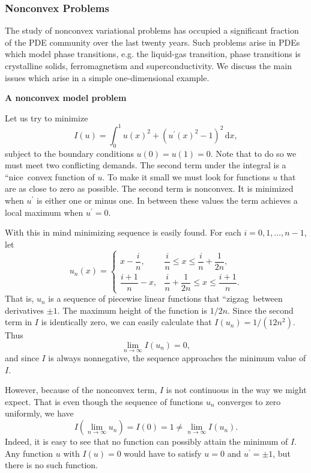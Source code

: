 \subsubsection{Nonconvex Problems}\label{subsec:nonconvex-variational-problems}

The study of nonconvex variational problems has occupied a significant fraction of the PDE community over the last twenty years. Such problems arise in PDEs which model phase transitions, e.g. the liquid-gas transition, phase transitions is crystalline solids, ferromagnetism and superconductivity. We discuss the main issues which arise in a simple one-dimensional example.

\textbf{A nonconvex model problem}

Let us try to minimize
\begin{equation}\label{eq:nonconvex-one-dimensional-model-energy}
I(u)=\int_0^1u(x)^2+(u^{\prime}(x)^2-1)^2\,\mathrm{d}x,
\end{equation}
subject to the boundary conditions $u(0)=u(1)=0$. Note that to do so we must meet two conflicting demands. The second term under the integral is a ``nice\textquotesingle\textquotesingle\ convex function of $u$. To make it small we must look for functions $u$ that are as close to zero as possible. The second term is nonconvex. It is minimized when $u^{\prime}$ is either one or minus one. In between these values the term achieves a local maximum when $u^{\prime}=0$.

With this in mind minimizing sequence is easily found. For each $i=0,1,\ldots,n-1$, let
\begin{equation}\label{eq:nonconvex-zigzag-minimizing-sequence}
u_n(x)=\begin{cases}x-\dfrac{i}{n},&\dfrac{i}{n}\leq x\leq\dfrac{i}{n}+\dfrac{1}{2n},\\\dfrac{i+1}{n}-x,&\dfrac{i}{n}+\dfrac{1}{2n}\leq x\leq\dfrac{i+1}{n}.\end{cases}
\end{equation}
That is, $u_n$ is a sequence of piecewise linear functions that ``zigzag\textquotesingle\textquotesingle\ between derivatives $\pm1$. The maximum height of the function is $1/2n$. Since the second term in $I$ is identically zero, we can easily calculate that $I(u_n)=1/(12n^2)$. Thus\[\lim_{n\to\infty}I(u_n)=0,\]and since $I$ is always nonnegative, the sequence approaches the minimum value of $I$.

However, because of the nonconvex term, $I$ is not continuous in the way we might expect. That is even though the sequence of functions $u_n$ converges to zero uniformly, we have\[I\left(\lim_{n\to\infty}u_n\right)=I(0)=1\neq\lim_{n\to\infty}I(u_n).\]Indeed, it is easy to see that no function can possibly attain the minimum of $I$. Any function $u$ with $I(u)=0$ would have to satisfy $u=0$ and $u^{\prime}=\pm1$, but there is no such function.

